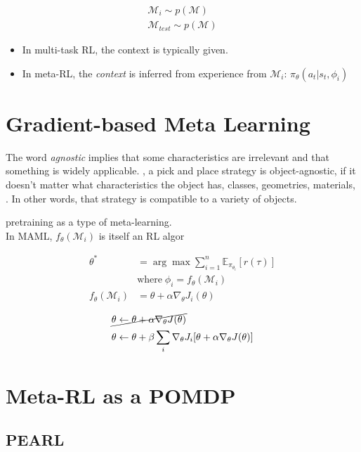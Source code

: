 \begin{align}
	\mathcal{M}_i \sim p(\mathcal{M})\\
	\mathcal{M}_{test} \sim p(\mathcal{M})
\end{align}

\begin{itemize}
	\item In multi-task \ac{RL}, the context is typically given.
	\item In meta-\ac{RL}, the \textit{context} is inferred from experience from $\mathcal{M}_i$: $\pi_\theta(a_t | s_t, \phi_i)$
\end{itemize}

\section{Gradient-based Meta Learning}

\note The word \textit{agnostic} implies that some characteristics are irrelevant and that something is widely applicable. \Eg, a pick and place strategy is object-agnostic, if it doesn't matter what characteristics the object has, classes, geometries, materials, \etc. In other words, that strategy is compatible to a variety of objects.

 pretraining as a type of meta-learning.\\
In \ac{MAML}, $f_\theta(\mathcal{M}_i)$ is itself an \ac{RL} \ac{algor} \cite{finn2017model}

\begin{align}
	\theta^* &= \arg\max \sum_{i=1}^n \mathbb{E}_{\pi_{\theta_i}} [r(\tau)]\\
	&\text{where}\; \phi_i = f_\theta(\mathcal{M}_i)\\
	f_\theta(\mathcal{M}_i) &= \theta + \alpha \nabla_\theta J_i(\theta)
\end{align}

\begin{align}
	&\cancel{\theta \leftarrow \theta + \alpha \nabla_\theta J(\theta)}\\
	&\theta \leftarrow \theta + \beta \sum_i \nabla_\theta J_i[\theta + \alpha \nabla_\theta J(\theta)]
\end{align}

\section{Meta-RL as a POMDP}
\subsection{PEARL}
